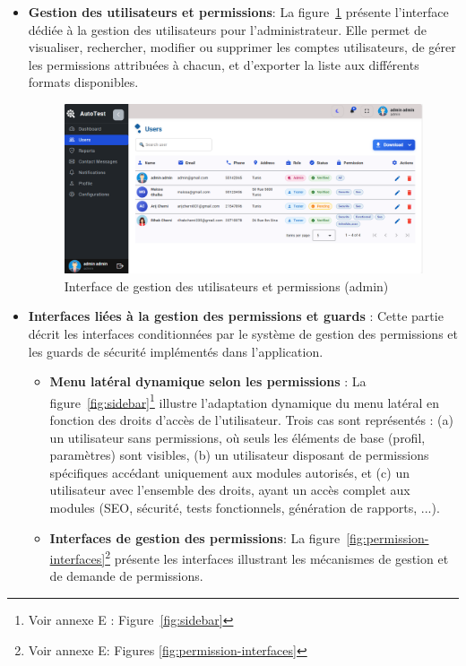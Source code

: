 \begin{itemize}[label=$\bullet$]
    \item \textbf{Gestion des utilisateurs et permissions}:
        La figure~\ref{fig:gestionUser} présente l’interface dédiée à la gestion des utilisateurs pour l’administrateur. Elle permet de visualiser, rechercher, modifier ou supprimer les comptes utilisateurs, de gérer les permissions attribuées à chacun, et d’exporter la liste aux différents formats disponibles.
        \begin{figure}[H]
            \centering
            \includegraphics[width=\linewidth]{chapitres/ch3Sp1/section/sprint1/img/interface/user-liste.PNG}
            \caption{\centering Interface de gestion des utilisateurs et permissions (admin)}
            \label{fig:gestionUser}
        \end{figure}
        \vspace{-0.3cm}
       \item \textbf{Interfaces liées à la gestion des permissions et guards} :
Cette partie décrit les interfaces conditionnées par le système de gestion des permissions et les guards de sécurité implémentés dans l’application.
\begin{itemize}[label=$\diamond$, left=0.01cm]
    \item \textbf{Menu latéral dynamique selon les permissions} : La figure~\ref{fig:sidebar}\footnote{Voir annexe E : Figure~\ref{fig:sidebar}} illustre l’adaptation dynamique du menu latéral en fonction des droits d’accès de l’utilisateur. Trois cas sont représentés : (a) un utilisateur sans permissions, où seuls les éléments de base (profil, paramètres) sont visibles, (b) un utilisateur disposant de permissions spécifiques accédant uniquement aux modules autorisés, et (c) un utilisateur avec l’ensemble des droits, ayant un accès complet aux modules (SEO, sécurité, tests fonctionnels, génération de rapports, ...).
        \item \textbf{Interfaces de gestion des permissions}: La figure~\ref{fig:permission-interfaces}\footnote{Voir annexe E: Figures \ref{fig:permission-interfaces}} présente les interfaces illustrant les mécanismes de gestion et de demande de permissions.    

\end{itemize}
\end{itemize}
